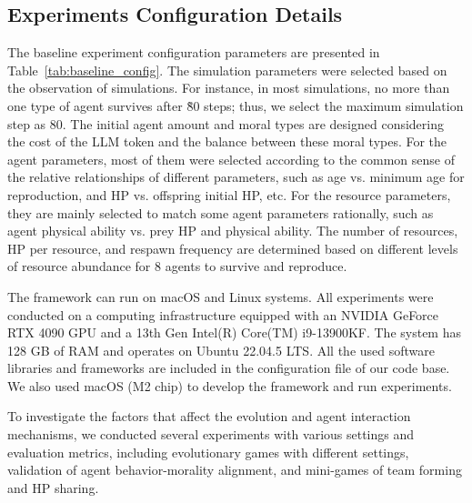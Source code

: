 \subsection{Experiments Configuration Details}

The baseline experiment configuration parameters are presented in Table~\ref{tab:baseline_config}. The simulation parameters were selected based on the observation of simulations. For instance, in most simulations, no more than one type of agent survives after \~80 steps; thus, we select the maximum simulation step as 80. The initial agent amount and moral types are designed considering the cost of the LLM token and the balance between these moral types. For the agent parameters, most of them were selected according to the common sense of the relative relationships of different parameters, such as age vs. minimum age for reproduction, and HP vs. offspring initial HP, etc. For the resource parameters, they are mainly selected to match some agent parameters rationally, such as agent physical ability vs. prey HP and physical ability. The number of resources, HP per resource, and respawn frequency are determined based on different levels of resource abundance for 8 agents to survive and reproduce.

The framework can run on macOS and Linux systems. All experiments were conducted on a computing infrastructure equipped with an NVIDIA GeForce RTX 4090 GPU and a 13th Gen Intel(R) Core(TM) i9-13900KF. The system has 128 GB of RAM and operates on Ubuntu 22.04.5 LTS. All the used software libraries and frameworks are included in the configuration file of our code base. We also used macOS (M2 chip) to develop the framework and run experiments.

To investigate the factors that affect the evolution and agent interaction mechanisms, we conducted several experiments with various settings and evaluation metrics, including evolutionary games with different settings, validation of agent behavior-morality alignment, and mini-games of team forming and HP sharing. 

